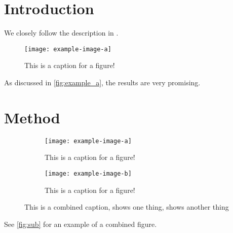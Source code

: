 \documentclass[12pt,a4paper]{scrarticle}
\begin{document}
\maketitle

\begin{abstract}
    
\end{abstract}

\tableofcontents

\section{Introduction}

We closely follow the description in \cite{adams1995}.

\begin{figure}[ht]
    \centering
    \texttt{[image: example-image-a]}
    \caption{This is a caption for a figure!}
    \label{fig:example_a}
\end{figure}

\lipsum[1] 

As discussed in \autoref{fig:example_a}, the results are very promising.

\section{Method}

\begin{figure}[ht]
    \begin{subfigure}{0.5\textwidth}
        \centering
        \texttt{[image: example-image-a]}
        \caption{This is a caption for a figure!}
        \label{fig:sub:example_a}
    \end{subfigure}
    \begin{subfigure}{0.5\textwidth}
        \centering
        \texttt{[image: example-image-b]}
        \caption{This is a caption for a figure!}
        \label{fig:sub:example_b}
    \end{subfigure}

    \caption{This is a combined caption,  shows one
    thing,  shows another thing}
    \label{fig:sub}
\end{figure}

\lipsum[1] 

See \autoref{fig:sub} for an example of a combined figure.

\lipsum[1] 
\end{document}
